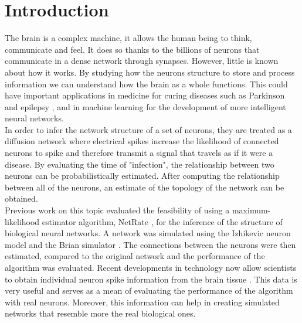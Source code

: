 
\chapter{Introduction}

The brain is a complex machine, it allows the human being to think, communicate and feel. It does so thanks to the billions of neurons that communicate in a dense network through synapses. However, little is known about how it works. By studying how the neurons structure to store and process information we can understand how the brain as a whole functions. This could have important applications in medicine for curing diseases such as Parkinson \cite{OldeDubbelinkKimT.E.2014Dbnt} and epilepsy \cite{PONTEN2007918}, and in machine learning for the development of more intelligent neural networks.\\

In order to infer the network structure of a set of neurons, they are treated as a diffusion network where electrical spikes increase the likelihood of connected neurons to spike and therefore transmit a signal that travels as if it were a disease. By evaluating the time of "infection", the relationship between two neurons can be probabilistically estimated. After computing the relationship between all of the neurons, an estimate of the topology of the network can be obtained. \\

Previous work on this topic \cite{pranav_report, alexandru2018estimating} evaluated the feasibility of using a maximum-likelihood estimator algorithm, NetRate \cite{rodriguez2011uncovering}, for the inference of the structure of biological neural networks. A network was simulated using the Izhikevic neuron model \cite{izhikevich2003simple} and the Brian simulator \cite{10.3389/neuro.01.026.2009}. The connections between the neurons were then estimated, compared to the original network and the performance of the algorithm was evaluated. Recent developments in technology now allow scientists to obtain individual neuron spike information from the brain tissue \cite{ito2016spontaneous, ito2014large, litke2004does}. This data is very useful and serves as a mean of evaluating the performance of the algorithm with real neurons. Moreover, this information can help in creating simulated networks that resemble more the real biological ones.

